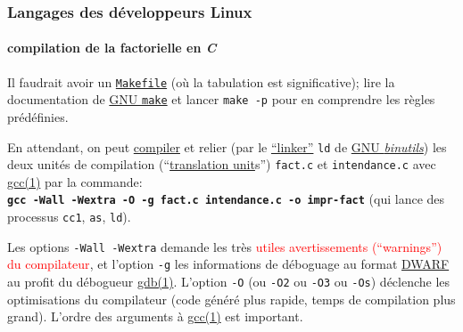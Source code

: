 \documentclass[xcolor=svgnames,final,smaller,a4]{beamer}
\begin{document}
\begin{frame}
  \frametitle{Langages des développeurs Linux}
  \framesubtitle{compilation de la factorielle en \textit{C}}

  \begin{relsize}{-1}
  Il faudrait avoir un
  \href{https://en.wikipedia.org/wiki/Makefile}{\texttt{Makefile}} (où
  la tabulation est significative); lire la documentation de
  \href{https://www.gnu.org/software/make/}{GNU \texttt{make}} et
  lancer \texttt{make -p} pour en comprendre les règles prédéfinies.
  \end{relsize}
  
  \vspace{0.3cm}
  
  En attendant, on peut
  \href{https://fr.wikipedia.org/wiki/Compilateur}{compiler} et relier
  (par le
  \href{https://en.wikipedia.org/wiki/Linker_(computing)}{``linker''}
  \texttt{ld} de \href{https://www.gnu.org/software/binutils/}{GNU
    \textit{binutils}}) les deux unités de compilation
  (``\href{https://en.wikipedia.org/wiki/Translation_unit_(programming)}{translation
    unit}s'') \texttt{fact.c} et \texttt{intendance.c} avec
  \href{https://man7.org/linux/man-pages/man1/gcc.1.html}{gcc(1)} par
  la commande:\\ \textbf{\texttt{gcc -Wall -Wextra -O -g fact.c intendance.c
    -o impr-fact}} (qui lance des processus \texttt{cc1}, \texttt{as},
  \texttt{ld}).

  \vspace{0.2cm}
  
  \begin{relsize}{-0.5}
  Les options \texttt{-Wall -Wextra} demande les très
  \textcolor{red}{utiles avertissements (``warnings'') du
    compilateur}, et l'option \texttt{-g} les informations de
  déboguage au format
  \href{https://en.wikipedia.org/wiki/DWARF}{DWARF} au profit du
  débogueur
  \href{https://man7.org/linux/man-pages/man1/gdb.1.html}{gdb(1)}. L'option
  \texttt{-O} (ou \texttt{-O2} ou \texttt{-O3} ou \texttt{-Os})
  déclenche les optimisations du compilateur (code généré plus rapide,
  temps de compilation plus grand). L'ordre des arguments à
  \href{https://man7.org/linux/man-pages/man1/gcc.1.html}{gcc(1)} est
  important.
  \end{relsize}
\end{frame}
\end{document}
